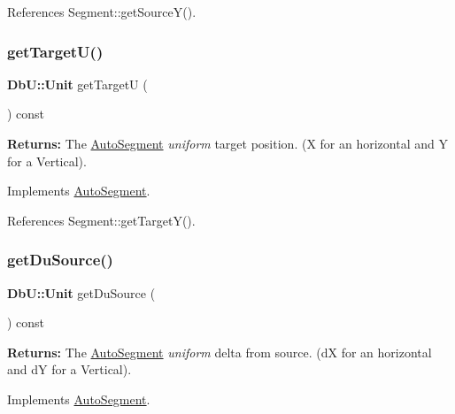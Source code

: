 References Segment\+::get\+Source\+Y().

\mbox{\label{classKatabatic_1_1AutoVertical_a4d52a506cd19dfa8e22e1dc0695bd960}} 
\subsubsection{\texorpdfstring{get\+Target\+U()}{getTargetU()}}
{\footnotesize\ttfamily \textbf{ Db\+U\+::\+Unit} get\+TargetU (\begin{DoxyParamCaption}{ }\end{DoxyParamCaption}) const\hspace{0.3cm}{\ttfamily [virtual]}}

{\bfseries Returns\+:} The \mbox{\hyperlink{classKatabatic_1_1AutoSegment}{Auto\+Segment}} {\itshape uniform} target position. (X for an horizontal and Y for a Vertical). 

Implements \mbox{\hyperlink{classKatabatic_1_1AutoSegment_a828fef2716cc9c370d6d170bb96556ec}{Auto\+Segment}}.



References Segment\+::get\+Target\+Y().

\mbox{\label{classKatabatic_1_1AutoVertical_a760500b1fd027c71f5362dd8c0b01ea7}} 
\subsubsection{\texorpdfstring{get\+Du\+Source()}{getDuSource()}}
{\footnotesize\ttfamily \textbf{ Db\+U\+::\+Unit} get\+Du\+Source (\begin{DoxyParamCaption}{ }\end{DoxyParamCaption}) const\hspace{0.3cm}{\ttfamily [virtual]}}

{\bfseries Returns\+:} The \mbox{\hyperlink{classKatabatic_1_1AutoSegment}{Auto\+Segment}} {\itshape uniform} delta from source. (dX for an horizontal and dY for a Vertical). 

Implements \mbox{\hyperlink{classKatabatic_1_1AutoSegment_ab4881df67bd8f036d0199ed6540fe774}{Auto\+Segment}}.



